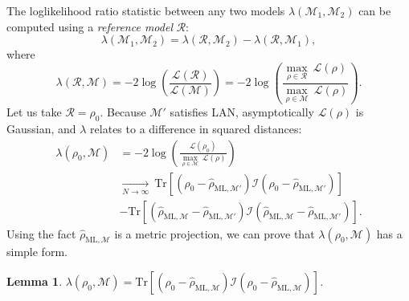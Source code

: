\documentclass[aps,pra, twocolumn]{revtex4-1}
\newcommand{\M}{\mathcal{M}}
\newcommand{\cL}{\mathcal{L}}
\newcommand{\rhohat}{\hat{\rho}}
\newcommand{\rhoML}[1]{\rhohat_{\scriptscriptstyle{\mathrm{ML},#1}}}
\newtheorem{lem}{Lemma}
\begin{document}
The loglikelihood ratio statistic between any two models $\lambda(\M_{1}, \M_{2})$ can be computed using a \emph{reference model} $\mathcal{R}$: 
\[\lambda(\M_{1}, \M_{2}) = \lambda(\mathcal{R},\M_{2}) - \lambda(\mathcal{R},\M_{1}),\]
where
\[\lambda(\mathcal{R}, \M) = -2 \log \left(\frac{\cL(\mathcal{R})}{\cL(\M)}\right) =  -2 \log \left(\frac{\underset{\rho \in \mathcal{R}}{\max}~\cL(\rho)}{\underset{\rho \in \M}{\max}~\cL(\rho)}\right).\]
Let us take $\mathcal{R} = \rho_{0}$. Because $\M'$ satisfies LAN, asymptotically $\mathcal{L}(\rho)$ is Gaussian, and $\lambda$ relates to a difference in squared distances:
\begin{align}
\label{eq:lambdalan}
\nonumber \lambda(\rho_{0}, \M)&= -2 \log \left(\frac{\cL(\rho_{0})}{\underset{\rho \in \M}{\max}~\cL(\rho)}\right)\\
\nonumber &\xrightarrow[N \rightarrow \infty]{}~\mathrm{Tr}[(\rho_{0} - \rhoML{\M'})\mathcal{I}(\rho_{0} - \rhoML{\M'})]\\
&-  \mathrm{Tr}[(\rhoML{\M} - \rhoML{\M'})\mathcal{I}(\rhoML{\M} - \rhoML{\M'})].
\end{align}
Using the fact $\rhoML{\M}$ is a metric projection, we can prove that $\lambda(\rho_{0}, \M)$ has a simple form.

\begin{lem}
$\lambda(\rho_{0}, \M) = \mathrm{Tr}[(\rho_{0} - \rhoML{\M})\mathcal{I}(\rho_{0} - \rhoML{\M})]$.
\end{lem}
\end{document}
